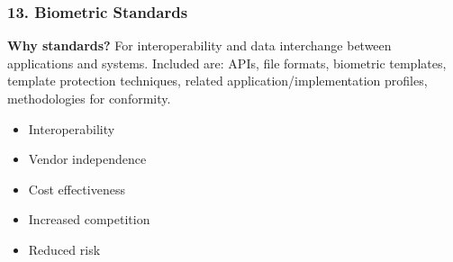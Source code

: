 \documentclass[a4paper]{article}
\begin{document}
    \subsubsection*{13. Biometric Standards}
      \textbf{Why standards?} For interoperability and data interchange between applications and systems. Included are: APIs, file formats, biometric templates, template protection techniques, related application/implementation profiles, methodologies for conformity.
      \begin{itemize}
        \item Interoperability
        \item Vendor independence
        \item Cost effectiveness
        \item Increased competition
        \item Reduced risk
      \end{itemize}
\end{document}
